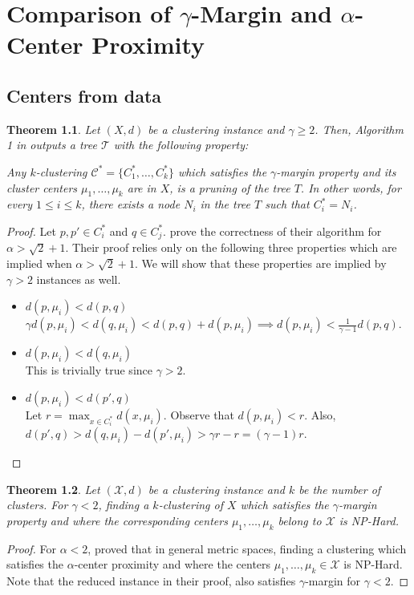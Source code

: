 \documentclass[letterpaper,12pt,titlepage,oneside,final]{book}
\newtheorem{theorem}{Theorem}
\newcommand{\mc}{\mathcal}
\begin{document}


\appendix
\chapter{Comparison of $\gamma$-Margin and $\alpha$-Center Proximity}
\section{Centers from data}
\begin{theorem}
\label{thm:upperCenterData}
Let $(X , d)$ be a clustering instance and $\gamma \ge 2$. Then, Algorithm 1 in \cite{balcan2012clustering} outputs a tree $\mc T$ with the following property: 


Any $k$-clustering $\mc C^* = \{C_1^*, \ldots, C_k^* \}$ which satisfies the $\gamma$-margin property and its cluster centers $\mu_1, \ldots, \mu_k$ are in $X$, is a pruning of the tree $T$. In other words, for every $1 \le i \le k$, there exists a node $N_i$ in the tree $T$ such that $C_i^* = N_i$.
\end{theorem}

\begin{proof}
Let $p, p' \in C_i^*$ and $q \in C_j^*$. \cite{balcan2012clustering} prove the correctness of their algorithm for $\alpha > \sqrt{2} + 1$. Their proof relies only on the following three properties which are implied when $\alpha > \sqrt{2} + 1$. We will show that these properties are implied by $\gamma > 2$ instances as well.
\begin{itemize}
\item $d(p, \mu_i) < d(p, q)$\\
$\gamma d(p, \mu_i) < d(q, \mu_i) < d(p, q) + d(p, \mu_i) \implies d(p, \mu_i) < \frac{1}{\gamma-1}d(p, q)$.
\item $d(p, \mu_i) < d(q, \mu_i)$\\
This is trivially true since $\gamma > 2$.
\item $d(p, \mu_i) < d(p', q)$\\
Let $r = \max_{x \in C_i^*} d(x, \mu_i)$. Observe that $d(p, \mu_i) < r$. Also, $d(p', q)> d(q, \mu_i)-d(p', \mu_i) > \gamma r - r = (\gamma -1)r$.
\end{itemize}
\end{proof}

\begin{theorem}
\label{thm:lowerCenterData}
Let $(\mc X, d)$ be a clustering instance and $k$ be the number of clusters. For $\gamma < 2$, finding a $k$-clustering of $X$ which satisfies the $\gamma$-margin property and where the corresponding centers $\mu_1, \ldots, \mu_k$ belong to $\mc X$ is NP-Hard.
\end{theorem}
\begin{proof}
For $\alpha < 2$, \cite{ben2014data} proved that in general metric spaces, finding a clustering which satisfies the $\alpha$-center proximity and where the centers $\mu_1, \ldots, \mu_k \in \mc X$ is NP-Hard. Note that the reduced instance in their proof, also satisfies $\gamma$-margin for $\gamma < 2$. 
\end{proof}
\end{document}
